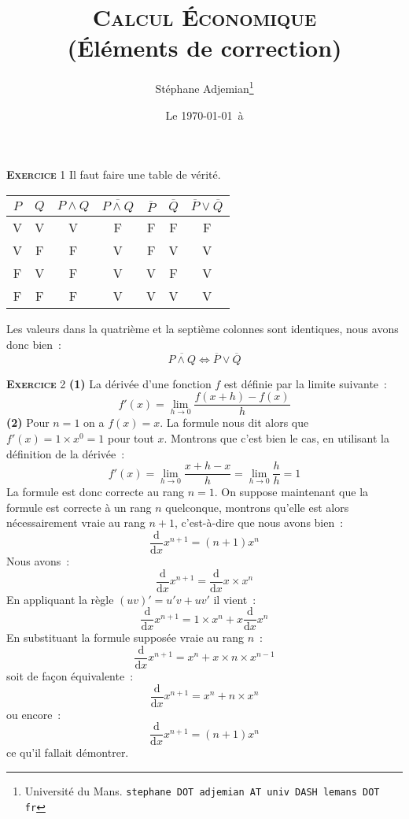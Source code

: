 \documentclass[10pt,a4paper,notitlepage]{article}
\newcommand{\exercice}[1]{\textsc{\textbf{Exercice}} #1}
\begin{document}
\title{\textsc{Calcul Économique}\\\textbf{(Éléments de correction)}}
\author{Stéphane Adjemian\thanks{Université du Mans. \texttt{stephane DOT adjemian AT univ DASH lemans DOT fr}}}
\date{Le \today\ à \thistime}

\maketitle

\exercice{1} Il faut faire une table de vérité.
\begin{table}[H]
  \centering
  \begin{tabular}{cc|ccccc}
    $P$ & $Q$ & $P \land Q$ & $\overline{P \land Q}$ & $\overline{P}$
    & $\overline{Q}$ & $\overline{P} \lor \overline{Q}$\\ \hline
    V & V & V & F & F & F & F \\
    V & F & F & V & F & V & V \\
    F & V & F & V & V & F & V \\
    F & F & F & V & V & V & V \\
  \end{tabular}
\end{table}
Les valeurs dans la quatrième et la septième colonnes sont identiques,
nous avons donc bien :  
\[
\overline{P \land Q} \Leftrightarrow \overline{P} \lor \overline{Q}
\]

\bigskip

\exercice{2} \textbf{(1)} La dérivée d'une fonction $f$ est définie
par la limite suivante :
\[
f'(x) = \lim_{h\rightarrow 0} \frac{f(x+h)-f(x)}{h}
\]
\textbf{(2)} Pour $n=1$ on a $f(x) = x$. La formule nous dit alors que
$f'(x) = 1\times x^0 = 1$ pour tout $x$. Montrons que c'est bien le
cas, en utilisant la définition de la dérivée :
\[
f'(x) = \lim_{h\rightarrow 0} \frac{x+h-x}{h} = \lim_{h\rightarrow 0}
\frac{h}{h} = 1 
\]
La formule est donc correcte au rang $n=1$. On suppose maintenant que
la formule est correcte à un rang $n$ quelconque, montrons qu'elle est
alors nécessairement vraie au rang $n+1$, c'est-à-dire que nous avons
bien :
\[
\frac{\mathrm d}{\mathrm dx}x^{n+1} = (n+1)x^n
\]
Nous avons :
\[
\frac{\mathrm d}{\mathrm dx} x^{n+1} = \frac{\mathrm d}{\mathrm dx} x
\times x^n
\]
En appliquant la règle $(uv)'=u'v+uv'$ il vient :
\[
\frac{\mathrm d}{\mathrm dx} x^{n+1} = 1 \times x^n + x \frac{\mathrm
  d}{\mathrm dx} x^n
\]
En substituant la formule supposée vraie au rang $n$ :
\[
\frac{\mathrm d}{\mathrm dx} x^{n+1} = x^n + x \times n \times x^{n-1}
\]
soit de façon équivalente :
\[
\frac{\mathrm d}{\mathrm dx} x^{n+1} = x^n + n \times x^{n}
\]
ou encore :
\[
\frac{\mathrm d}{\mathrm dx} x^{n+1} = (n+1) x^{n}
\]
ce qu'il fallait démontrer.
\end{document}
